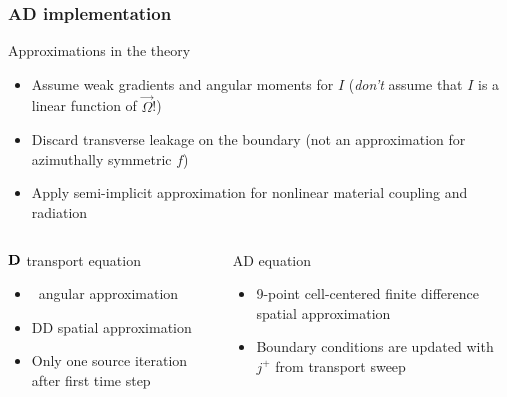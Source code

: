 \documentclass{beamer}
\begin{document}
\begin{frame}
  \frametitle{AD implementation}
  \begin{block}{Approximations in the theory}
    \begin{itemize}
      \item Assume weak gradients and angular moments for $I$ (\emph{don't}
        assume that $I$ is a linear function of $\vec{\Omega}$!)
      \item Discard transverse leakage on the boundary (not an approximation
        for azimuthally symmetric $f$)
      \item Apply semi-implicit approximation for nonlinear material coupling
        and radiation
    \end{itemize}
  \end{block}
  \vspace{-\baselineskip}
  \begin{columns}[t]
    \begin{column}{.48\textwidth}
\begin{block}{$\mathbf{D}$ transport equation}
  \begin{itemize}
    \item \SN\ angular approximation
    \item DD spatial approximation
    \item Only one source iteration after first time step
  \end{itemize}
\end{block}
    \end{column}
    \begin{column}{.48\textwidth}
\begin{block}{AD equation}
  \begin{itemize}
    \item 9-point cell-centered finite difference spatial approximation
    \item Boundary conditions are updated with $j^+$ from transport sweep
  \end{itemize}
\end{block}
    \end{column}
  \end{columns}
\end{frame}

\end{document}
